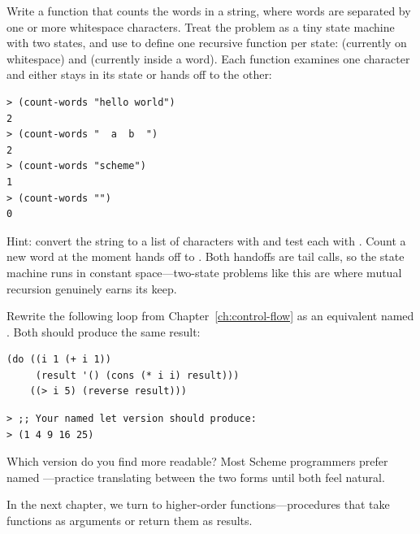 \begin{exercise}
Write a function  that counts the words in a string, where words are separated by one or more whitespace characters. Treat the problem as a tiny state machine with two states, and use  to define one recursive function per state:  (currently on whitespace) and  (currently inside a word). Each function examines one character and either stays in its state or hands off to the other:

\begin{lstlisting}[style=repl]
> (count-words "hello world")
2
> (count-words "  a  b  ")
2
> (count-words "scheme")
1
> (count-words "")
0
\end{lstlisting}

Hint: convert the string to a list of characters with  and test each with . Count a new word at the moment  hands off to . Both handoffs are tail calls, so the state machine runs in constant space---two-state problems like this are where mutual recursion genuinely earns its keep.
\end{exercise}

\begin{exercise}
Rewrite the following  loop from Chapter~\ref{ch:control-flow} as an equivalent named . Both should produce the same result:

\begin{lstlisting}
(do ((i 1 (+ i 1))
     (result '() (cons (* i i) result)))
    ((> i 5) (reverse result)))
\end{lstlisting}

\begin{lstlisting}[style=repl]
> ;; Your named let version should produce:
> (1 4 9 16 25)
\end{lstlisting}

Which version do you find more readable? Most Scheme programmers prefer named ---practice translating between the two forms until both feel natural.
\end{exercise}

In the next chapter, we turn to higher-order functions---procedures that take functions as arguments or return them as results.

\chapterend
